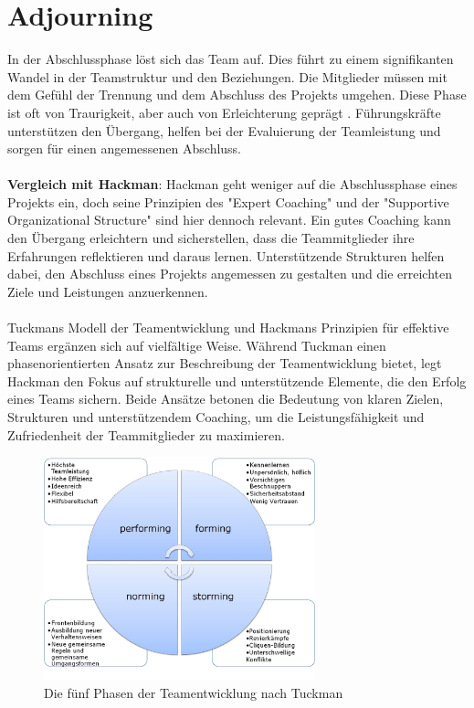 \section{Adjourning}
In der Abschlussphase löst sich das Team auf. Dies führt zu einem signifikanten Wandel in der Teamstruktur und den Beziehungen. Die Mitglieder müssen mit dem Gefühl der Trennung und dem Abschluss des Projekts umgehen. Diese Phase ist oft von Traurigkeit, aber auch von Erleichterung geprägt \cite{WESTCHETERUNIVERSITY}. Führungskräfte unterstützen den Übergang, helfen bei der Evaluierung der Teamleistung und sorgen für einen angemessenen Abschluss.\\\\
\textbf{Vergleich mit Hackman}: Hackman geht weniger auf die Abschlussphase eines Projekts ein, doch seine Prinzipien des "Expert Coaching" und der "Supportive Organizational Structure" sind hier dennoch relevant. Ein gutes Coaching kann den Übergang erleichtern und sicherstellen, dass die Teammitglieder ihre Erfahrungen reflektieren und daraus lernen. Unterstützende Strukturen helfen dabei, den Abschluss eines Projekts angemessen zu gestalten und die erreichten Ziele und Leistungen anzuerkennen.\\\\
Tuckmans Modell der Teamentwicklung und Hackmans Prinzipien für effektive Teams ergänzen sich auf vielfältige Weise. Während Tuckman einen phasenorientierten Ansatz zur Beschreibung der Teamentwicklung bietet, legt Hackman den Fokus auf strukturelle und unterstützende Elemente, die den Erfolg eines Teams sichern. Beide Ansätze betonen die Bedeutung von klaren Zielen, Strukturen und unterstützendem Coaching, um die Leistungsfähigkeit und Zufriedenheit der Teammitglieder zu maximieren.
\begin{figure}[bth]
  \centering
  \includegraphics[width=0.7\textwidth]{Examples/Teamentwicklung.jpg}
  \caption{Die fünf Phasen der Teamentwicklung nach Tuckman}
  \label{fig:Tuckman}
\end{figure}

